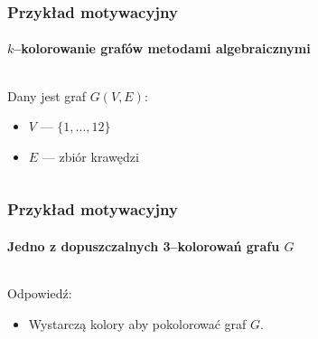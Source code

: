\documentclass{beamer}
\begin{document}
\begin{frame}
    \frametitle{Przykład motywacyjny}
    \framesubtitle{$k$--kolorowanie grafów metodami algebraicznymi}

    \begin{columns}
        \begin{column}[l]{0.5\textwidth}
            Dany jest graf $G(V,E)$:
                \begin{itemize}
                    \item $V$ --- $\{ 1, \ldots, 12 \}$
                    \item $E$ --- zbiór krawędzi
                \end{itemize}
        \end{column}
        \begin{column}[r]{0.4\textwidth}
            \begin{center}
                
            \end{center}
        \end{column}
    \end{columns}
\end{frame}

\begin{frame}
    \frametitle{Przykład motywacyjny}
    \framesubtitle{Jedno z dopuszczalnych 3--kolorowań grafu $G$}

    \begin{columns}
        \begin{column}[l]{0.5\textwidth}
            Odpowiedź:
                \begin{itemize}
                    \item Wystarczą  kolory \newline aby pokolorować graf $G$.
                \end{itemize}
        \end{column}
        \begin{column}[r]{0.4\textwidth}
            \begin{center}
                
            \end{center}
        \end{column}
    \end{columns}
\end{frame}
\end{document}
